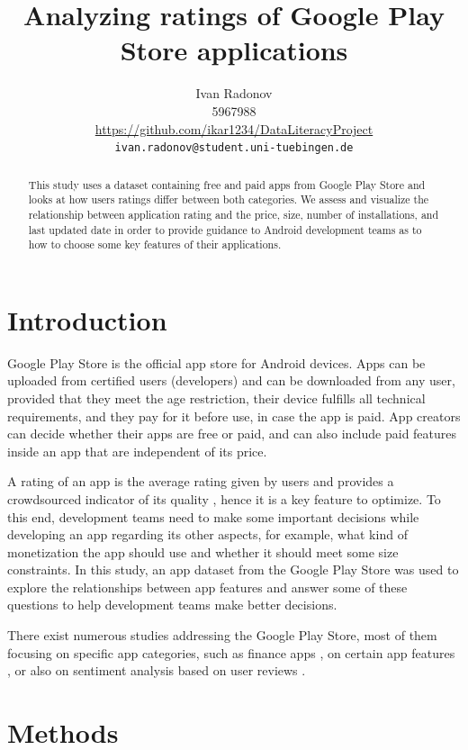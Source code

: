 \documentclass{article}
\title{Analyzing ratings of Google Play Store applications}
\author{%
  Ivan Radonov \\
  5967988 \\
  \url{https://github.com/ikar1234/DataLiteracyProject} \\
  \texttt{ivan.radonov@student.uni-tuebingen.de} \\
  }
\begin{document}
\maketitle

\begin{abstract}
  This study uses a dataset containing free and paid apps from Google Play Store and looks at how users ratings differ between both categories. We assess and visualize the relationship between application rating and the price, size, number of installations, and last updated date in order to provide guidance to Android development teams as to how to choose some key features of their applications.
\end{abstract}

\section{Introduction}

Google Play Store is the official app store for Android devices. Apps can be uploaded from certified users (developers) and can be downloaded from any user, provided that they meet the age restriction, their device fulfills all technical requirements, and they pay for it before use, in case the app is paid. App creators can decide whether their apps are free or paid, and can also include paid features inside an app that are independent of its price.

A rating of an app is the average rating given by users and provides a crowdsourced indicator of its quality \cite{mobileapprating}, hence it is a key feature to optimize. To this end, development teams need to make some important decisions while developing an app regarding its other aspects, for example, what kind of monetization the app should use and whether it should meet some size constraints. In this study, an app dataset from the Google Play Store was used to explore the relationships between app features and answer some of these questions to help development teams make better decisions.

There exist numerous studies addressing the Google Play Store, most of them focusing on specific app categories, such as finance apps \cite{financialapps}, on certain app features \cite{freshapps}, or also on sentiment analysis based on user reviews \cite{sentiment}.

\section{Methods}
\end{document}
